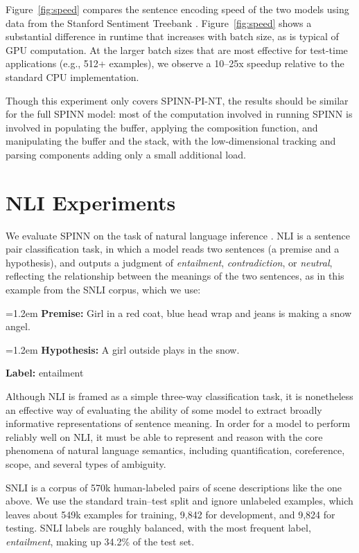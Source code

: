 \documentclass[11pt]{article}
\newcommand{\snli}[3]{{\vspace{0.25em}
{\small \setlength{\parindent}{0.6em} \hangindent=1.2em  \textbf{Premise:} #1\par}\vspace{0.25em}
{\small \setlength{\parindent}{0.6em} \hangindent=1.2em   \textbf{Hypothesis:} #2\par}\vspace{0.25em}
{\small \setlength{\parindent}{0.6em}  \textbf{Label:} #3\par}
}}
\begin{document}
Figure~\ref{fig:speed} compares the sentence encoding speed of the two models using data from the Stanford Sentiment Treebank \citep{socher2013recursive}. Figure~\ref{fig:speed} shows a substantial difference in runtime that increases with batch size, as is typical of GPU computation. At the larger batch sizes that are most effective for test-time applications (e.g., 512+ examples), we observe a 10--25x speedup relative to the standard CPU implementation.

Though this experiment only covers SPINN-PI-NT, the results should be similar for the full SPINN model: most of the computation involved in running SPINN is involved in populating the buffer, applying the composition function, and manipulating the buffer and the stack, with the low-dimensional tracking and parsing components adding only a small additional load.

\section{NLI Experiments}

We evaluate SPINN on the task of natural language inference \citep[NLI, a.k.a. recognizing textual entailment, or RTE;][]{dagan2006pascal}. NLI is a sentence pair classification task, in which a model reads two sentences (a premise and a hypothesis), and outputs a judgment of {\it entailment}, {\it contradiction}, or {\it neutral}, reflecting the relationship between the meanings of the two sentences, as in this example from the SNLI corpus, which we use: 

\snli{Girl in a red coat, blue head wrap and jeans is making a snow angel.}
{A girl outside plays in the snow.}
{entailment}

Although NLI is framed as a simple three-way classification task, it is nonetheless an effective way of evaluating the ability of some model to extract broadly informative representations of sentence meaning. In order for a model to perform reliably well on NLI, it must be able to represent and reason with the core phenomena of natural language semantics, including quantification, coreference, scope, and several types of ambiguity.

SNLI is a corpus of 570k human-labeled pairs of scene descriptions like the one above. We use the standard train--test split and ignore unlabeled examples, which leaves about 549k examples for training, 9,842 for development, and 9,824 for testing. SNLI labels are roughly balanced, with the most frequent label, {\it entailment}, making up 34.2\% of the test set.
\end{document}
